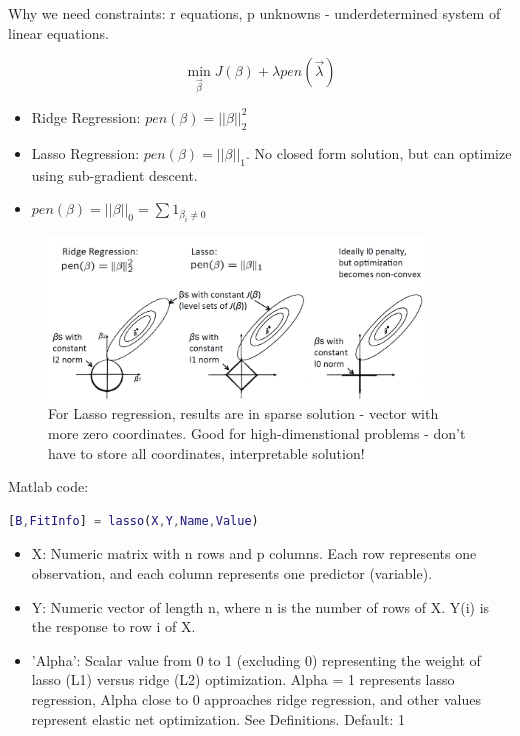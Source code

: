 \documentclass[letterpaper,10pt]{article}
\begin{document}
Why we need constraints: r equations, p unknowns - underdetermined system of linear equations. 

$$\min_{\vec{\beta}} J(\beta)+\lambda pen(\vec{\lambda})$$
\begin{itemize}
	\item Ridge Regression: $pen(\beta)=||\beta||_2^2$
	\item Lasso Regression: $pen(\beta)=||\beta||_1$. No closed form solution, but can optimize using sub-gradient descent.
	\item $pen(\beta)=||\beta||_0=\sum 1_{\beta_i \neq 0}$
\end{itemize}

\begin{figure}[!h]
	\centering
	\includegraphics[width=10cm]{./img/ridgeregression.png}
	\caption{For Lasso regression, results are in sparse solution - vector with more zero coordinates. Good for high-dimenstional problems - don't have to store all coordinates, interpretable solution! }
\end{figure}

Matlab code:
\begin{lstlisting}[language=Matlab]
[B,FitInfo] = lasso(X,Y,Name,Value)
\end{lstlisting}
\begin{itemize}
	\item X: Numeric matrix with n rows and p columns. Each row represents one observation, and each column represents one predictor (variable).
	\item Y: Numeric vector of length n, where n is the number of rows of X. Y(i) is the response to row i of X.
	\item 'Alpha': Scalar value from 0 to 1 (excluding 0) representing the weight of lasso (L1) versus ridge (L2) optimization. Alpha = 1 represents lasso regression, Alpha close to 0 approaches ridge regression, and other values represent elastic net optimization. See Definitions.
	Default: 1
\end{itemize}
\end{document}
